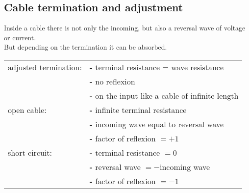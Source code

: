 \subsection{Cable termination and adjustment}
Inside a cable there is not only the incoming, but also a reversal wave of voltage or current.\\
But depending on the termination it can be absorbed.
\begin{table*}[h!]
\begin{tabular}{ll}
adjusted termination:& \textbf{-} terminal resistance = wave resistance\\
&\textbf{-} no reflexion\\
&\textbf{-} on the input like a cable of infinite length\\
open cable: & \textbf{-} infinite terminal resistance\\
& \textbf{-} incoming wave equal to reversal wave\\
& \textbf{-} factor of reflexion $=  +1$\\
short circuit: & \textbf{-} terminal resistance $=0$\\
& \textbf{-} reversal wave $= -$incoming wave\\
& \textbf{-} factor of reflexion $=-1$
\end{tabular}
\end{table*}
